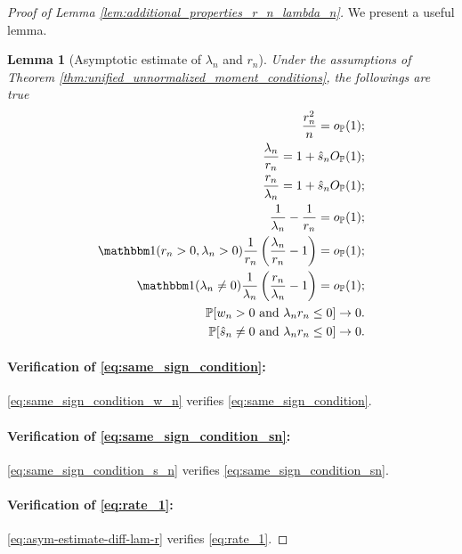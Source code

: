 \documentclass[12pt]{article}
\newtheorem{lemma}{Lemma}
\theoremstyle{definition}
\def\P{\mathbb{P}}
\def\P{\mathbb{P}}
\renewcommand{\P}{\mathbb{P}}							%
\newcommand{\indicator}{\mathbbm 1}						%
\begin{document}
\begin{proof}[Proof of Lemma \ref{lem:additional_properties_r_n_lambda_n}]
We present a useful lemma.
\begin{lemma}[Asymptotic estimate of $\lambda_n$ and $r_n$]\label{lem:asym-estimate-lam-r}
	Under the assumptions of Theorem \ref{thm:unified_unnormalized_moment_conditions}, the followings are true
	\begin{align}
		\frac{r_n^2}{n}=o_{\P}(1);& \label{eq:r_n_over_n_rate}\\
		\frac{\lambda_n}{r_n}=1+\hat s_nO_{\P}(1); & \label{eq:asym-estimate-ratio-lam-r}\\
		\frac{r_n}{\lambda_n}=1+\hat s_nO_{\P}(1); & \label{eq:asym-estimate-ratio-r-lam}\\
		\frac{1}{\lambda_n}-\frac{1}{r_n}=o_{\P}(1); & \label{eq:asym-estimate-diff-lam-r}\\
		\indicator(r_n>0,\lambda_n>0)\frac{1}{r_n}\left(\frac{\lambda_n}{r_n}-1\right)=o_{\P}(1); & \label{eq:asym-estimate-diff-lam-r-multiplication}\\
		\indicator(\lambda_n\neq 0)\frac{1}{\lambda_n}\left(\frac{r_n}{\lambda_n}-1\right)=o_{\P}(1); & \label{eq:asym-estimate-diff-r-lam-multiplication}\\
		\P[w_n>0 \text{ and }\lambda_n r_n\leq 0]\rightarrow0. & \label{eq:same_sign_condition_w_n}\\
		\P[\hat s_n\neq 0 \text{ and }\lambda_n r_n\leq 0]\rightarrow0. & \label{eq:same_sign_condition_s_n}
	\end{align}
	\end{lemma}

	\paragraph{Verification of \eqref{eq:same_sign_condition}:}

	\eqref{eq:same_sign_condition_w_n} verifies \eqref{eq:same_sign_condition}.

	\paragraph{Verification of \eqref{eq:same_sign_condition_sn}:}

	\eqref{eq:same_sign_condition_s_n} verifies \eqref{eq:same_sign_condition_sn}.

	\paragraph{Verification of \eqref{eq:rate_1}:}
	
	\eqref{eq:asym-estimate-diff-lam-r} verifies \eqref{eq:rate_1}.


\end{proof}
\end{document}

